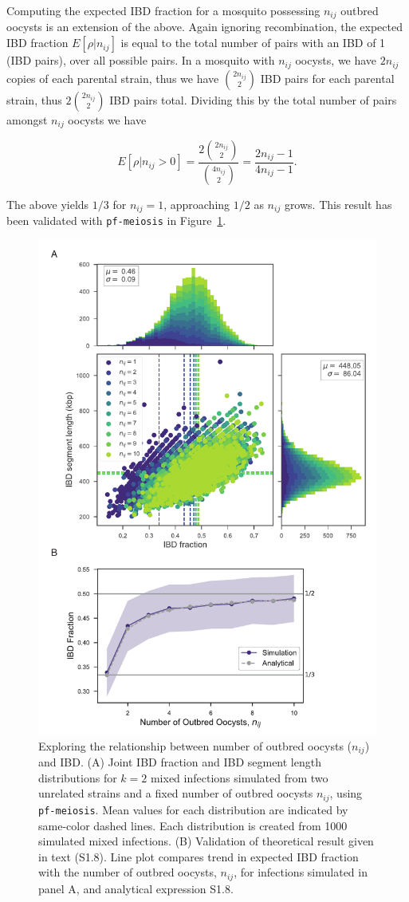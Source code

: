 \documentclass[9pt]{article}
\begin{document}
Computing the expected IBD fraction for a mosquito possessing $n_{ij}$ outbred oocysts is an extension of the above. Again ignoring recombination, the expected IBD fraction $E[\rho|n_{ij}]$ is equal to the total number of pairs with an IBD of 1 (IBD pairs), over all possible pairs. In a mosquito with $n_{ij}$ oocysts, we have $2n_{ij}$ copies of each parental strain, thus we have ${2n_{ij} \choose 2}$ IBD pairs for each parental strain, thus $2 {2n_{ij} \choose 2}$ IBD pairs total. Dividing this by the total number of pairs amongst $n_{ij}$ oocysts we have

\begin{equation} \label{eq1}
E[\rho|n_{ij} > 0] = \frac{2{2n_{ij} \choose 2}}{{4n_{ij} \choose 2}} = \frac{2n_{ij} - 1}{4n_{ij} - 1}.
\end{equation}

The above yields $1/3$ for $n_{ij}=1$, approaching $1/2$ as $n_{ij}$ grows. This result has been validated with \texttt{pf-meiosis} in Figure~\ref{fig:validoocyst}.


\begin{figure}[pt]
  \centering{}
  \includegraphics[width = .75\textwidth]{supFigures/supp-Fig1.pdf}
  \caption{Exploring the relationship between number of outbred oocysts ($n_{ij}$) and IBD. (A) Joint IBD fraction and IBD segment length distributions for $k=2$ mixed infections simulated from two unrelated strains and a fixed number of outbred oocysts $n_{ij}$, using \texttt{pf-meiosis}. Mean values for each distribution are indicated by same-color dashed lines. Each distribution is created from 1000 simulated mixed infections. (B) Validation of theoretical result given in text (S1.8). Line plot compares trend in expected IBD fraction with the number of outbred oocysts, $n_{ij}$, for infections simulated in panel A, and analytical expression S1.8.} \label{fig:validoocyst}
\end{figure}
\end{document}
